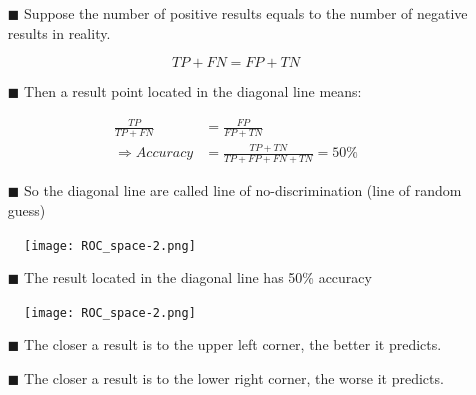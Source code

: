 \documentclass{beamer}
\begin{document}
\begin{frame}
    \begin{itemize}
        \item[$\blacksquare$] Suppose the number of positive results equals to the number of negative results in reality.
    \end{itemize}
    \begin{equation}
        TP + FN = FP + TN
    \end{equation}
    \begin{itemize}
        \item[$\blacksquare$] Then a result point located in the diagonal line means:
    \end{itemize}
    \begin{equation}
        \begin{aligned}
            \frac{TP}{TP+FN} &= \frac{FP}{FP+TN} \\
            \Rightarrow Accuracy &= \frac{TP + TN}{TP + FP + FN + TN} = 50\%
	      \end{aligned}
    \end{equation}
    \begin{itemize}
        \item[$\blacksquare$] So the diagonal line are called line of no-discrimination (line of random guess)
    \end{itemize}
\end{frame}


\begin{frame}
    \vspace{-1cm}
    \begin{figure}[h]
        \centering
        \texttt{[image: ROC\_space-2.png]}    
    \end{figure}
    \vspace{-1cm}
    \begin{itemize}
        \item[$\blacksquare$] The result located in the diagonal line has 50\% accuracy
    \end{itemize}
\end{frame}

\begin{frame}
    \vspace{-1cm}
    \begin{figure}[h]
        \centering
        \texttt{[image: ROC\_space-2.png]}    
    \end{figure}
    \vspace{-1cm}
    \begin{itemize}
        \item[$\blacksquare$] The closer a result is to the upper left corner, the better it predicts.
        \item[$\blacksquare$] The closer a result is to the lower right corner, the worse it predicts.
    \end{itemize}
\end{frame}
\end{document}
